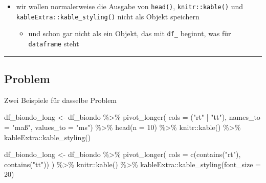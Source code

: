 \documentclass[
  letterpaper,
  DIV=11]{scrartcl}
\newenvironment{Shaded}{\begin{snugshade}}{\end{snugshade}}
\newcommand{\AttributeTok}[1]{\textcolor[rgb]{0.40,0.45,0.13}{#1}}
\newcommand{\DecValTok}[1]{\textcolor[rgb]{0.68,0.00,0.00}{#1}}
\newcommand{\FunctionTok}[1]{\textcolor[rgb]{0.28,0.35,0.67}{#1}}
\newcommand{\NormalTok}[1]{\textcolor[rgb]{0.00,0.23,0.31}{#1}}
\newcommand{\OtherTok}[1]{\textcolor[rgb]{0.00,0.23,0.31}{#1}}
\newcommand{\SpecialCharTok}[1]{\textcolor[rgb]{0.37,0.37,0.37}{#1}}
\newcommand{\StringTok}[1]{\textcolor[rgb]{0.13,0.47,0.30}{#1}}
\providecommand{\tightlist}{%
  \setlength{\itemsep}{0pt}\setlength{\parskip}{0pt}}\usepackage{longtable,booktabs,array}
\begin{document}
\begin{itemize}
\tightlist
\item
  wir wollen normalerweise die Ausgabe von \texttt{head()},
  \texttt{knitr::kable()} und \texttt{kableExtra::kable\_styling()}
  nicht als Objekt speichern

  \begin{itemize}
  \tightlist
  \item
    und schon gar nicht als ein Objekt, das mit \texttt{df\_} beginnt,
    was für \texttt{dataframe} steht
  \end{itemize}
\end{itemize}

\begin{center}\rule{0.5\linewidth}{0.5pt}\end{center}

\subsection{Problem}

Zwei Beispiele für dasselbe Problem

\begin{Shaded}
\begin{Highlighting}[]
\NormalTok{df\_biondo\_long }\OtherTok{\textless{}{-}}\NormalTok{ df\_biondo }\SpecialCharTok{\%\textgreater{}\%} 
  \FunctionTok{pivot\_longer}\NormalTok{(}
    \AttributeTok{cols =}\NormalTok{ (}\StringTok{"rt"} \SpecialCharTok{|} \StringTok{"tt"}\NormalTok{),}
    \AttributeTok{names\_to =} \StringTok{"maß"}\NormalTok{,}
    \AttributeTok{values\_to =} \StringTok{"ms"}\NormalTok{) }\SpecialCharTok{\%\textgreater{}\%} 
  \FunctionTok{head}\NormalTok{(}\AttributeTok{n =} \DecValTok{10}\NormalTok{) }\SpecialCharTok{\%\textgreater{}\%} 
\NormalTok{  knitr}\SpecialCharTok{::}\FunctionTok{kable}\NormalTok{() }\SpecialCharTok{\%\textgreater{}\%} 
\NormalTok{  kableExtra}\SpecialCharTok{::}\FunctionTok{kable\_styling}\NormalTok{()}
\end{Highlighting}
\end{Shaded}

\begin{Shaded}
\begin{Highlighting}[]
\NormalTok{df\_biondo\_long }\OtherTok{\textless{}{-}}\NormalTok{ df\_biondo }\SpecialCharTok{\%\textgreater{}\%}
  \FunctionTok{pivot\_longer}\NormalTok{(}
    \AttributeTok{cols =} \FunctionTok{c}\NormalTok{(}\FunctionTok{contains}\NormalTok{(}\StringTok{"rt"}\NormalTok{), }\FunctionTok{contains}\NormalTok{(}\StringTok{"tt"}\NormalTok{))}
\NormalTok{  ) }\SpecialCharTok{\%\textgreater{}\%}
\NormalTok{  knitr}\SpecialCharTok{::}\FunctionTok{kable}\NormalTok{() }\SpecialCharTok{\%\textgreater{}\%}
\NormalTok{  kableExtra}\SpecialCharTok{::}\FunctionTok{kable\_styling}\NormalTok{(}\AttributeTok{font\_size =} \DecValTok{20}\NormalTok{)}
\end{Highlighting}
\end{Shaded}
\end{document}
